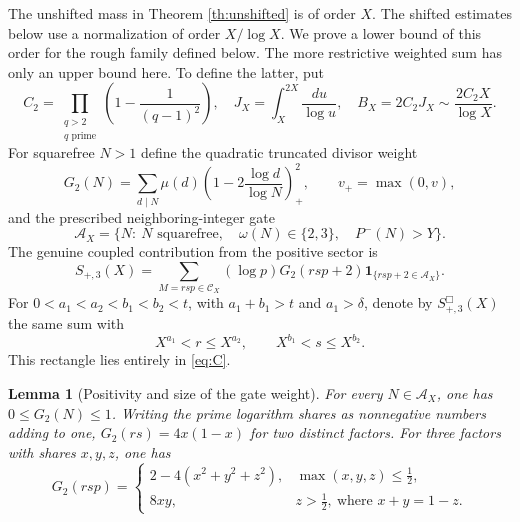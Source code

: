 \documentclass[11pt]{article}
\newtheorem{lemma}[theorem]{Lemma}
\newcommand{\one}{\mathbf 1}
\newcommand{\cset}{\mathcal C}
\newcommand{\aset}{\mathcal A}
\newcommand{\phimin}{P^-}
\begin{document}
The unshifted mass in Theorem \ref{th:unshifted} is of order $X$.
The shifted estimates below use a normalization of order $X/\log X$.
We prove a lower bound of this order for the rough family defined below.
The more restrictive weighted sum has only an upper bound here.
To define the latter, put
\[
 C_2=\prod_{\substack{q>2\\q\text{ prime}}}
          \left(1-\frac1{(q-1)^2}\right),\quad
 J_X=\int_X^{2X}\frac{du}{\log u},\quad B_X=2C_2J_X
    \sim\frac{2C_2X}{\log X}.
\]
For squarefree $N>1$ define the quadratic truncated divisor weight
\begin{equation}\label{eq:G}
 G_2(N)=\sum_{d\mid N}\mu(d)
                  \left(1-2\frac{\log d}{\log N}\right)_+^2,
 \qquad v_+=\max(0,v),
\end{equation}
and the prescribed neighboring-integer gate
\begin{equation}\label{eq:A}
 \aset_X=\{N:\ N\text{ squarefree},\quad
 \omega(N)\in\{2,3\},\quad \phimin(N)>Y\}.
\end{equation}
The genuine coupled contribution from the positive sector is
\begin{equation}\label{eq:S}
 S_{+,3}(X)=\sum_{M=rsp\in\cset_X}
       (\log p)G_2(rsp+2)\one_{\{rsp+2\in\aset_X\}}.
\end{equation}
For $0<a_1<a_2<b_1<b_2<t$, with $a_1+b_1>t$ and
$a_1>\delta$, denote by $S_{+,3}^{\Box}(X)$ the same sum with
\[
 X^{a_1}<r\le X^{a_2},\qquad
 X^{b_1}<s\le X^{b_2}.
\]
This rectangle lies entirely in \eqref{eq:C}.

\begin{lemma}[Positivity and size of the gate weight]\label{lem:G}
For every $N\in\aset_X$, one has $0\le G_2(N)\le1$.
Writing the prime logarithm shares as nonnegative numbers adding to one,
$G_2(rs)=4x(1-x)$ for two distinct factors.  For three factors with
shares $x,y,z$, one has
\begin{equation}\label{eq:G3}
 G_2(rsp)=\begin{cases}
  2-4(x^2+y^2+z^2),&\max(x,y,z)\le\frac12,\\
  8xy,& z>\frac12,\ \text{where }x+y=1-z.
 \end{cases}
\end{equation}
\end{lemma}
\end{document}
